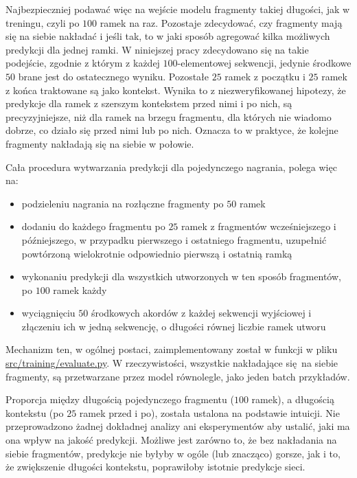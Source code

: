 Najbezpieczniej podawać więc na wejście modelu fragmenty takiej długości, jak w treningu, czyli po
$100$ ramek na raz. Pozostaje zdecydować, czy fragmenty mają się na siebie nakładać i jeśli tak, to
w jaki sposób agregować kilka możliwych predykcji dla jednej ramki. W niniejszej pracy zdecydowano
się na takie podejście, zgodnie z którym z każdej $100$-elementowej sekwencji, jedynie środkowe $50$
brane jest do ostatecznego wyniku. Pozostałe $25$ ramek z początku i $25$ ramek z końca traktowane
są jako kontekst. Wynika to z niezweryfikowanej hipotezy, że predykcje dla ramek z szerszym
kontekstem przed nimi i po nich, są precyzyjniejsze, niż dla ramek na brzegu fragmentu, dla których
nie wiadomo dobrze, co działo się przed nimi lub po nich. Oznacza to w praktyce, że kolejne
fragmenty nakładają się na siebie w połowie. 

Cała procedura wytwarzania predykcji dla pojedynczego nagrania, polega więc na:
\begin{itemize}
    \item podzieleniu nagrania na rozłączne fragmenty po $50$ ramek
    \item dodaniu do każdego fragmentu po $25$ ramek z fragmentów wcześniejszego i późniejszego, w
        przypadku pierwszego i ostatniego fragmentu, uzupełnić powtórzoną wielokrotnie odpowiednio
        pierwszą i ostatnią ramką
    \item wykonaniu predykcji dla wszystkich utworzonych w ten sposób fragmentów, po $100$ ramek
        każdy
    \item wyciągnięciu $50$ środkowych akordów z każdej sekwencji wyjściowej i złączeniu ich w jedną
        sekwencję, o długości równej liczbie ramek utworu
\end{itemize}
Mechanizm ten, w ogólnej postaci, zaimplementowany został w funkcji  w pliku
\url{src/training/evaluate.py}. W rzeczywistości, wszystkie nakładające się na siebie fragmenty, są
przetwarzane przez model równolegle, jako jeden batch przykładów.

Proporcja między długością pojedynczego fragmentu ($100$ ramek), a długością kontekstu (po $25$
ramek przed i po), została ustalona na podstawie intuicji. Nie przeprowadzono żadnej dokładnej
analizy ani eksperymentów aby ustalić, jaki ma ona wpływ na jakość predykcji. Możliwe jest zarówno
to, że bez nakładania na siebie fragmentów, predykcje nie byłyby w ogóle (lub znacząco) gorsze, jak
i to, że zwiększenie długości kontekstu, poprawiłoby istotnie predykcje sieci.



